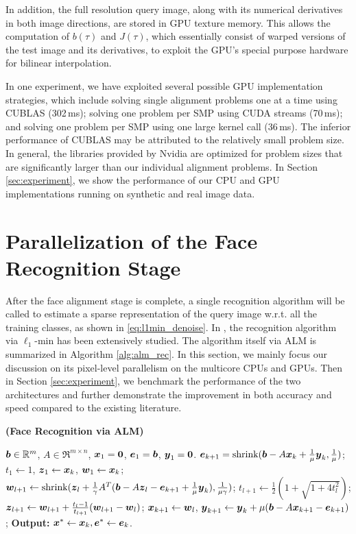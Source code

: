 \documentclass[10pt,twocolumn,letterpaper]{article}
\begin{document}
In addition, the full resolution query image, along with its numerical derivatives in both
image directions, are stored in GPU texture memory. This  allows the
computation of $b(\tau)$ and $J(\tau)$, which essentially consist of warped
versions of the test image and its derivatives, to exploit the GPU's special
purpose hardware for bilinear interpolation.

In one experiment, we have exploited several possible GPU implementation
strategies, which include solving single alignment problems one at a time using
CUBLAS (302\,ms); solving one problem per SMP using CUDA streams (70\,ms); and
solving one problem per SMP using one large kernel call (36\,ms). The inferior
performance of CUBLAS may be attributed to the relatively small problem size.
In general, the libraries provided by Nvidia are optimized for problem sizes
that are significantly larger than our individual alignment problems.  In
Section \ref{sec:experiment}, we show the performance of our CPU and GPU
implementations running on synthetic and real image data.

\section{Parallelization of the Face Recognition Stage}
\label{sec:recognition}
After the face alignment stage is complete, a single recognition algorithm will
be called to estimate a sparse representation of the query image w.r.t. all the
training classes, as shown in \eqref{eq:l1min_denoise}. In
\cite{WrightJ2009-PAMI,YangA2010-ICIP,WagnerA2011-PAMI}, the recognition
algorithm via $\ell_1$-min has been extensively studied. The algorithm itself
via ALM is summarized in Algorithm \ref{alg:alm_rec}.  In this section, we
mainly focus our discussion on its pixel-level parallelism on the multicore
CPUs and GPUs. Then in Section \ref{sec:experiment}, we benchmark the
performance of the two architectures and further demonstrate the improvement in
both accuracy and speed compared to the existing literature.
\begin{algorithm}[t]
\caption{\bf (Face Recognition via ALM)} \label{alg:alm_rec} 
\begin{algorithmic}[1]
\begin{small}
 ${\boldsymbol{b}} \in {\mathbb{R}}^m$, $A \in \Re^{m \times n}$,
${\boldsymbol{x}}_1 = \boldsymbol{0}$, $\boldsymbol{e}_1 = {\boldsymbol{b}}$, $\boldsymbol{y}_1 =
\boldsymbol{0}$.
\STATE $\boldsymbol{e}_{k+1} = \textup{shrink}({\boldsymbol{b}} - A{\boldsymbol{x}}_k +
\frac{1}{\mu}\boldsymbol{y}_k, \frac{1}{\mu})$;
\STATE $t_1\leftarrow 1$, $\boldsymbol{z}_1 \leftarrow {\boldsymbol{x}}_k$, $\boldsymbol{w}_1 \leftarrow {\boldsymbol{x}}_k$;
\STATE $\boldsymbol{w}_{l+1} \leftarrow \textup{shrink}(\boldsymbol{z}_l +
\frac{1}{\gamma}A^T({\boldsymbol{b}} - A\boldsymbol{z}_l - \boldsymbol{e}_{k+1} +
\frac{1}{\mu}\boldsymbol{y}_k), \frac{1}{\mu\gamma})$;
\STATE $t_{l+1} \leftarrow \frac{1}{2}( 1 +
\sqrt{1+4t_l^2})$;
\STATE $\boldsymbol{z}_{l+1} \leftarrow \boldsymbol{w}_{l+1} + \frac{t_l - 1}{t_{l+1}}(\boldsymbol{w}_{l+1} - \boldsymbol{w}_l)$;
\ENDWHILE
\STATE ${\boldsymbol{x}}_{k+1} \leftarrow \boldsymbol{w}_{l}$,  \; $\boldsymbol{y}_{k+1} \leftarrow \boldsymbol{y}_k + \mu ({\boldsymbol{b}} - A{\boldsymbol{x}}_{k+1} - \boldsymbol{e}_{k+1})$;
\ENDWHILE \STATE
{\bf Output:} ${\boldsymbol{x}}^* \leftarrow {\boldsymbol{x}}_k, \boldsymbol{e}^* \leftarrow \boldsymbol{e}_k$.
\end{small}
\end{algorithmic}
\end{algorithm}
\end{document}
